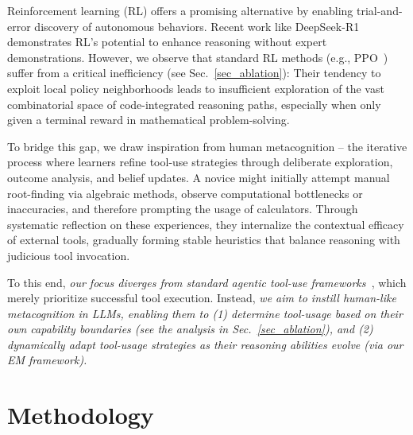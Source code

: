 Reinforcement learning (RL) offers a promising alternative by enabling trial-and-error discovery of autonomous behaviors. Recent work like DeepSeek-R1~\citep{dsr1} demonstrates RL's potential to enhance reasoning without expert demonstrations. However, we observe that standard RL methods (e.g., PPO~\cite{ppo}) suffer from a critical inefficiency (see Sec.~\ref{sec_ablation}): Their tendency to exploit local policy neighborhoods leads to insufficient exploration of the vast combinatorial space of code-integrated reasoning paths, especially when only given a terminal reward in mathematical problem-solving.

To bridge this gap, we draw inspiration from human metacognition -- the iterative process where learners refine tool-use strategies through deliberate exploration, outcome analysis, and belief updates. A novice might initially attempt manual root-finding via algebraic methods, observe computational bottlenecks or inaccuracies, and therefore prompting the usage of calculators. Through systematic reflection on these experiences, they internalize the contextual efficacy of external tools, gradually forming stable heuristics that balance reasoning with judicious tool invocation. 


To this end, \emph{our focus diverges from standard agentic tool-use frameworks~\citep{agentr}}, which merely prioritize successful tool execution. Instead, \emph{we aim to instill \emph{human-like metacognition} in LLMs, enabling them to (1) determine tool-usage based on their own capability boundaries (see the analysis in Sec.~\ref{sec_ablation}), and (2) dynamically adapt tool-usage strategies as their reasoning abilities evolve (via our EM framework).}




\section{Methodology}

